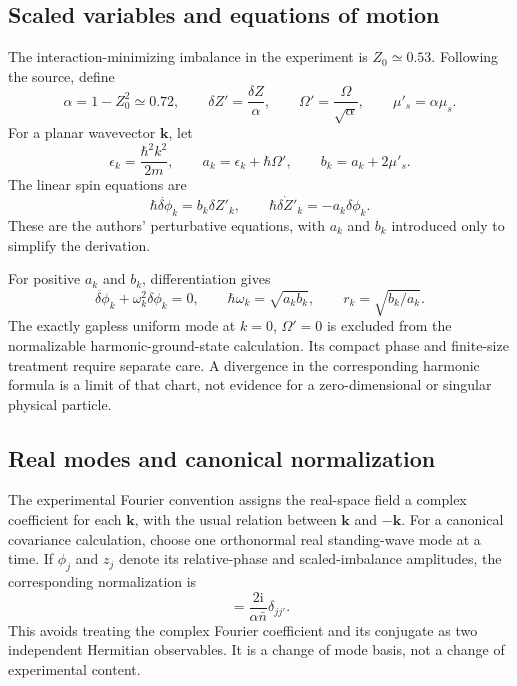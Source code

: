\documentclass[11pt,a4paper]{article}
\theoremstyle{definition}
\theoremstyle{remark}
\newcommand{\ii}{\mathrm{i}}
\newcommand{\musp}{\mu'_s}
\newcommand{\nb}{\bar n}
\begin{document}
\subsection{Scaled variables and equations of motion}
The interaction-minimizing imbalance in the experiment is $Z_0\simeq0.53$. Following the source, define
\begin{equation}
 \alpha=1-Z_0^2\simeq0.72,\qquad
 \delta Z'=\frac{\delta Z}{\alpha},\qquad
 \Omega'=\frac{\Omega}{\sqrt\alpha},\qquad
 \musp=\alpha\mu_s.
 \label{eq:scaled}
\end{equation}
For a planar wavevector $\boldsymbol k$, let
\begin{equation}
 \epsilon_k=\frac{\hbar^2k^2}{2m},\qquad
 a_k=\epsilon_k+\hbar\Omega',\qquad
 b_k=a_k+2\musp.
 \label{eq:ab}
\end{equation}
The linear spin equations are
\begin{equation}
 \hbar\dot{\delta\phi}_k=b_k\delta Z'_k,
 \qquad
 \hbar\dot{\delta Z'}_k=-a_k\delta\phi_k.
 \label{eq:spin_motion}
\end{equation}
These are the authors' perturbative equations, with $a_k$ and $b_k$ introduced only to simplify the derivation.\cite{zhang2026}

For positive $a_k$ and $b_k$, differentiation gives
\begin{equation}
 \ddot{\delta\phi}_k+\omega_k^2\delta\phi_k=0,
 \qquad \hbar\omega_k=\sqrt{a_kb_k},\qquad
 r_k=\sqrt{b_k/a_k}.
 \label{eq:dispersion}
\end{equation}
The exactly gapless uniform mode at $k=0$, $\Omega'=0$ is excluded from the normalizable harmonic-ground-state calculation. Its compact phase and finite-size treatment require separate care. A divergence in the corresponding harmonic formula is a limit of that chart, not evidence for a zero-dimensional or singular physical particle.

\subsection{Real modes and canonical normalization}
The experimental Fourier convention assigns the real-space field a complex coefficient for each $\boldsymbol k$, with the usual relation between $\boldsymbol k$ and $-\boldsymbol k$. For a canonical covariance calculation, choose one orthonormal real standing-wave mode at a time. If $\phi_j$ and $z_j$ denote its relative-phase and scaled-imbalance amplitudes, the corresponding normalization is
\begin{equation}
 [\phi_j,z_{j'}]=\frac{2\ii}{\alpha\nb}\delta_{jj'}.
 \label{eq:commutator}
\end{equation}
This avoids treating the complex Fourier coefficient and its conjugate as two independent Hermitian observables. It is a change of mode basis, not a change of experimental content.\cite{zhang2026}
\end{document}
